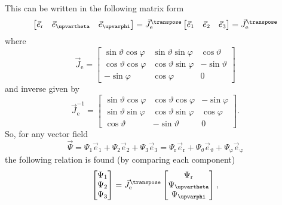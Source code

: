 This can be written in the following matrix form
\begin{equation}
\label{Eq1:XtoSpherical}
	\begin{bmatrix}
		\vec{e}_{\mathrm{r}} & \vec{e}_{\upvartheta} & \vec{e}_{\upvarphi}
	\end{bmatrix} = \vec{J}_{\mathrm{e}}^\transpose\begin{bmatrix}
		\vec{e}_1 & \vec{e}_2 & \vec{e}_3
	\end{bmatrix} = \vec{J}_{\mathrm{e}}^\transpose
\end{equation}
where
\begin{equation}
	\vec{J}_{\mathrm{e}} = \begin{bmatrix}
		\sin\vartheta\cos\varphi & \sin\vartheta\sin\varphi & \cos\vartheta\\
		\cos\vartheta\cos\varphi & \cos\vartheta\sin\varphi & -\sin\vartheta\\
		-\sin\varphi & \cos\varphi & 0
	\end{bmatrix}
\end{equation}
and inverse given by
\begin{equation}
	\vec{J}_{\mathrm{e}}^{-1} = \begin{bmatrix}
		\sin\vartheta\cos\varphi & \cos\vartheta\cos\varphi & -\sin\varphi\\
		\sin\vartheta\sin\varphi & \cos\vartheta\sin\varphi & \cos\varphi\\
		\cos\vartheta & -\sin\vartheta & 0
	\end{bmatrix}.
\end{equation}
So, for any vector field
\begin{equation}
	\vec{\Psi} = \Psi_1\vec{e}_1 + \Psi_2\vec{e}_2  + \Psi_3\vec{e}_3 = \Psi_{\mathrm{r}}\vec{e}_{\mathrm{r}} + \Psi_{\upvartheta}\vec{e}_{\upvartheta} + \Psi_{\upvarphi}\vec{e}_{\upvarphi} 
\end{equation}
the following relation is found (by comparing each component)
\begin{equation}
\label{Eq1:SphericalToXfun}
	\begin{bmatrix}
		\Psi_1\\
		\Psi_2\\
		\Psi_3
	\end{bmatrix} = \vec{J}_{\mathrm{e}}^{\transpose} 
	\begin{bmatrix}
		\Psi_{\mathrm{r}}\\
		\Psi_{\upvartheta}\\
		\Psi_{\upvarphi}
	\end{bmatrix},
\end{equation}
